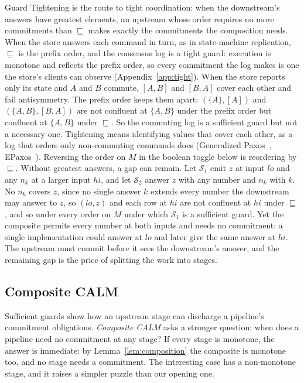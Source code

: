 \documentclass[sigconf]{cidr-2027}
\theoremstyle{remark}
\newcommand{\commitment}{commitment\xspace}
\newcommand{\commitments}{commitments\xspace}
\newcommand{\Spec}{\mathcal{S}}
\begin{document}
Guard Tightening is the route to tight coordination: when the
downstream's answers have greatest elements, an upstream whose order requires
no more \commitments than $\sqsubseteq$ makes exactly the \commitments the
composition needs. When the store answers each command in turn, as in
state-machine replication, $\sqsubseteq$ is the prefix order, and the
consensus log is a tight guard: execution is monotone and reflects the prefix
order, so every \commitment the log makes is one the store's clients can
observe (Appendix~\ref{app:tight}). \textcolor{reviewed}{When the store reports only its state and
$A$ and $B$ commute, $[A,B]$ and $[B,A]$ cover each other and fail
antisymmetry.} The prefix order keeps them apart: $(\{A\},[A])$ and
$(\{A,B\},[B,A])$ are not confluent at $\{A,B\}$ under the prefix order but
confluent at $\{A,B\}$ under $\sqsubseteq$. So the commuting log is a
sufficient guard but not a necessary one. \textcolor{reviewed}{Tightening means identifying
values that cover each other, as a log that orders only non-commuting
commands does (Generalized Paxos~\cite{lamport2005generalized},
EPaxos~\cite{moraru2013epaxos}).} Reversing the order
on $M$ in the boolean toggle below is reordering by $\sqsubseteq$. Without
greatest answers, a gap can remain. Let $\Spec_1$ emit $z$ at input
$\mathit{lo}$ and any $n_k$ at a larger input $\mathit{hi}$, and let $\Spec_2$
answer $z$ with any number and $n_k$ with $k$. No $n_k$ covers $z$, since no single
answer $k$ extends every number the downstream may answer to $z$, so $(\mathit{lo},z)$ and each row at $\mathit{hi}$ are not confluent at
$\mathit{hi}$ under $\sqsubseteq$, and so under every order on $M$ under which
$\Spec_1$ is a sufficient guard. Yet the composite permits every number at both
inputs and needs no \commitment: a single implementation could answer at
$\mathit{lo}$ and later give the same answer at $\mathit{hi}$. The upstream
must commit before it sees the downstream's answer, and the remaining gap is
the price of splitting the work into stages.

\subsection{Composite CALM}
\label{sec:composite-calm}

Sufficient guards show how an upstream
stage can discharge a pipeline's \commitment obligations. \emph{Composite CALM} asks a stronger question: when does a pipeline need no
\commitment at any stage? If every stage is monotone, the answer is immediate:
by Lemma~\ref{lem:composition} the composite is monotone too, and no stage needs
a \commitment. The interesting case has a non-monotone stage, and it raises a
simpler puzzle than our opening one.
\end{document}
